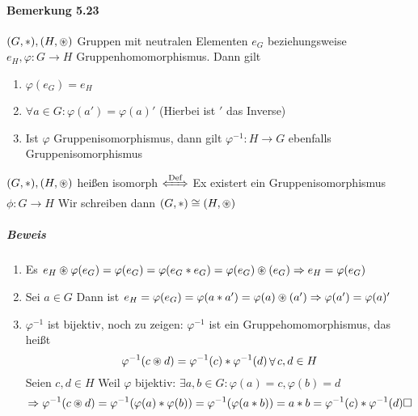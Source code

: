 \documentclass[a4paper]{scrartcl}
\DeclareMathOperator{\Forall}{\forall}
\begin{document}
\paragraph{Bemerkung 5.23}
\label{sec-3-1-8-2}
$(G,*),(H,\oast)$ Gruppen mit neutralen Elementen $e_G$ beziehungsweise $e_H,\varphi:G\to H$ Gruppenhomomorphismus. Dann gilt
\begin{enumerate}
\item $\varphi(e_G) = e_H$
\item $\Forall a\in G:\varphi(a') = \varphi(a)'$ (Hierbei ist $'$ das Inverse)
\item Ist $\varphi$ Gruppenisomorphismus, dann gilt $\varphi^{-1}:H\to G$ ebenfalls Gruppenisomorphismus
\end{enumerate}
$(G,*),(H,\oast)$ heißen isomorph $\xLeftrightarrow{\text{Def}}$ Ex existert ein Gruppenisomorphismus $\phi:G\to H$ Wir schreiben dann $(G,*) \cong (H,\oast)$
\subparagraph{Beweis}
\label{sec-3-1-8-2-1}
\begin{enumerate}
\item Es $e_H\oast \varphi(e_G) = \varphi(e_G) = \varphi(e_G*e_G) = \varphi(e_G) \oast(e_G) \Rightarrow e_H = \varphi(e_G)$
\item Sei $a\in G$ Dann ist $e_H = \varphi(e_G) = \varphi(a*a') = \varphi(a)\oast(a') \Rightarrow \varphi(a') = \varphi(a)'$
\item $\varphi^{-1}$ ist bijektiv, noch zu zeigen: $\varphi^{-1}$ ist ein Gruppehomomorphismus, das heißt
\[\varphi^{-1}(c\oast d) = \varphi^{-1}(c)*\varphi^{-1}(d) \Forall c,d\in H\]
Seien $c,d\in H$ Weil $\varphi$ bijektiv: $\exists a,b\in G:\varphi(a) = c,\varphi(b) =d$
\[\Rightarrow \varphi^{-1}(c\oast d) = \varphi^{-1}(\varphi(a)*\varphi(b)) = \varphi^{-1}(\varphi(a*b)) = a*b = \varphi^{-1}(c)*\varphi^{-1}(d)\hfill\square\]
\end{enumerate}
\end{document}
